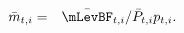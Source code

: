 \begin{eqnarray*}
  \label{eq:mBar}
   \bar{m}_{t,i} & = & \bar{\mLevBF}_{t,i}/\bar{{P}}_{t,i}{p}_{t,i} .
\end{eqnarray*}
